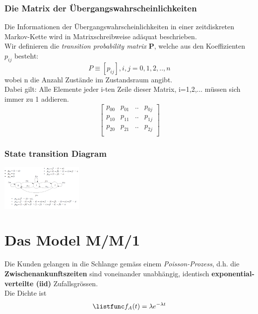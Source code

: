 \documentclass{report}
\newenvironment{Figure}
	{\par\medskip\noindent\minipage{\linewidth}}
	{\endminipage\par\medskip}
\theoremstyle{definition}
\theoremstyle{example}
\begin{document}
      \subsubsection{Die Matrix der Übergangswahrscheinlichkeiten}
Die Informationen der Übergangswahrscheinlichkeiten in einer zeitdiskreten Markov-Kette wird in Matrixschreibweise adäquat beschrieben.\\
Wir definieren die \textit{transition probability matrix} \textbf{P}, welche aus den Koeffizienten $p_{ij}$ besteht:
\begin{equation}
   P \equiv [p_{ij}], i, j = 0,1,2,..,n
\end{equation}
wobei n die Anzahl Zustände im Zustandsraum angibt.\\

Dabei gilt: Alle Elemente jeder i-ten Zeile dieser Matrix, i=1,2,... müssen sich immer zu 1 addieren.
$$
\begin{bmatrix} 
p_{00} & p_{01} & .. & p_{0j} \\
p_{10} & p_{11} & .. & p_{1j} \\
p_{20} & p_{21} & .. & p_{2j} \\
\end{bmatrix}
$$

      \subsubsection{State transition Diagram}
\begin{Figure}
\centering
\includegraphics[width=150px]{img/STD.png}
	\label{fig:Das State Transition Diagram}
\end{Figure}

\section{Das Model M/M/1}
Die Kunden gelangen in die Schlange gemäss einem \textit{Poisson-Prozess}, d.h. die \textbf{Zwischenankunftszeiten} sind voneinander unabhängig, identisch \textbf{exponential-verteilte (iid)} Zufallsgrössen.\\
Die Dichte ist
\begin{equation}
   \listfunc f_A (t) = \lambda e^{-\lambda t}
\end{equation}
\end{document}
